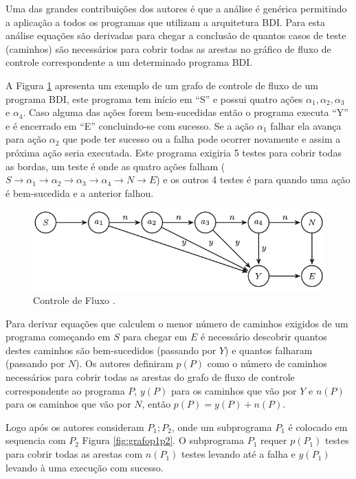 Uma das grandes contribuições dos autores é que a  análise é genérica permitindo a aplicação a todos os programas que utilizam a arquitetura BDI. Para esta análise equações são derivadas  para chegar a conclusão de quantos casos de teste (caminhos) são necessários para cobrir todas as arestas no gráfico de fluxo de controle correspondente a um determinado programa BDI.

A Figura \ref{fig:control_fluxo} apresenta um exemplo de um grafo de controle de fluxo de um programa BDI, este programa tem início em “S” e possui quatro ações $\alpha_{1}, \alpha_{2}, \alpha_{3}$ e $\alpha_{4}$. Caso alguma das ações forem bem-sucedidas então o programa executa “Y” e é encerrado em “E” concluindo-se com sucesso. Se a ação $\alpha_{1}$ falhar ela avança para ação $\alpha_{2}$ que pode ter sucesso ou a falha pode ocorrer novamente e assim a próxima ação seria executada. Este programa exigiria 5 testes para cobrir todas as bordas, um teste é onde as quatro ações falham ($S \rightarrow \alpha_{1} \rightarrow \alpha_{2} \rightarrow \alpha_{3} \rightarrow \alpha_{4} \rightarrow N \rightarrow E$) e os outros 4 testes é para quando uma ação é bem-sucedida e a anterior falhou.

\begin{figure}[ht]
\centering
\includegraphics[scale=0.5]{imagens/control_flow.png}
\caption{Controle de Fluxo \cite{winikoff2017bdi}.}
\label{fig:control_fluxo}
\end{figure}

Para derivar equações que calculem o menor número de caminhos exigidos de um programa começando em $S$ para chegar em $E$ é necessário descobrir quantos destes caminhos são bem-sucedidos (passando por $Y$) e quantos falharam (passando por $N$). Os autores definiram $p(P)$ como o número de caminhos necessários para cobrir todas as arestas do grafo de fluxo de controle correspondente ao programa $P$, $y(P)$ para os caminhos que vão por $Y$ e $n(P)$ para os caminhos que vão por $N$, então $p(P) = y(P) + n(P)$.

Logo após os autores consideram $P_{1};P_{2}$, onde um subprograma $P_{1}$ é colocado em sequencia com $P_{2}$ Figura \ref{fig:grafop1p2}. O subprograma $P_{1}$ requer $p(P_{1})$ testes para cobrir todas as arestas com $n(P_{1})$ testes levando até a falha e $y(P_{1})$ levando à uma execução com sucesso.

